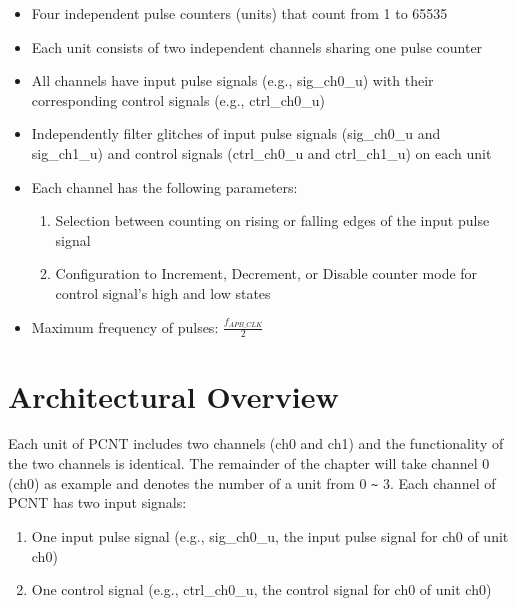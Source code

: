 \documentclass[main\_\_EN.tex]{subfiles}
\begin{document}
\begin{itemize}
    \item Four independent pulse counters (units) that count from 1 to 65535
    \item Each unit consists of two independent channels sharing one pulse counter
    \item All channels have input pulse signals (e.g., sig\_ch0\_u) with their corresponding control signals (e.g., ctrl\_ch0\_u)
    \item Independently filter glitches of input pulse signals (sig\_ch0\_u and sig\_ch1\_u) and control signals (ctrl\_ch0\_u and ctrl\_ch1\_u) on each unit
    \item Each channel has the following parameters:
        \begin{enumerate}
            \item Selection between counting on rising or falling edges of the input pulse signal
            \item Configuration to Increment, Decrement, or Disable counter mode for control signal's high and low states
        \end{enumerate}
    \item Maximum frequency of pulses: $\frac{f_{APB\_CLK}}{2}$
\end{itemize}


\section{Architectural Overview}
\label{sec:pcnt-arch-overview}

Each unit of PCNT includes two channels (ch0 and ch1) and the functionality of the two channels is identical. The remainder of the chapter will take channel 0 (ch0) as example and  denotes the number of a unit from 0 \verb+~+ 3. Each channel of PCNT has two input signals:

\begin{enumerate}
    \item One input pulse signal (e.g., sig\_ch0\_u, the input pulse signal for ch0 of unit  ch0)
    \item One control signal (e.g., ctrl\_ch0\_u, the control signal for ch0 of unit  ch0)
\end{enumerate}
\end{document}
